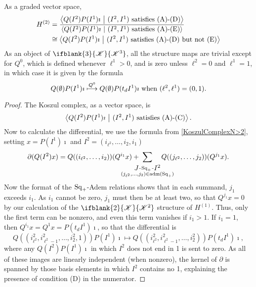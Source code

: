 \documentclass[10pt]{article}
\makeatletter
\newcommand{\LL}[1]{\ifblank{#1}{\scrK}{\scrK^{#1}}}
\newcommand{\produces}[3]{{#1}{#3}{#2}}
\newcommand{\admis}[1]{\mathrm{adm}(#1)}%
\renewcommand{\Q}{Q}
\newcommand{\SqShift}{\Sq_{\smash{+}}}
\newcommand{\Sq}{\mathrm{Sq}}
\renewcommand{\produces}[3]{
{
\def\labelstyle{\scriptstyle}
\xymatrix@C=2em@1{
{#1}
\ar@{-}[r]|-{{\,#3\,}}
&%
{#2}%
}}}
\makeatother
\begin{document}
\begin{CalculatingRepeatedKoszul}
\begin{prop}
As a graded vector space,
\begin{alignat*}{2}
H^{(2)}
&=
\frac{\left\langle \Q(I^2)P(I^1)\imath\ \middle|\  (I^2,I^1)\textup{ satisfies \textup{(A)}-\textup{(D)}}\right\rangle}{\left\langle \Q(I^2)P(I^1)\imath\ \middle|\  (I^2,I^1)\textup{ satisfies \textup{(A)}-\textup{(E)}}\right\rangle}%
\\
&\cong
{\left\langle \Q(I^2)P(I^1)\imath\ \middle|\  (I^2,I^1)\textup{ satisfies \textup{(A)}-\textup{(D)} but not \textup{(E)}}\right\rangle}%
\end{alignat*}
As an object of $\LL{3}$, all the structure maps are trivial except for $\Q^0$, which is defined whenever $\ell^1>0$, and is zero unless $\ell^2=0$ and $\ell^1=1$, in which case it is given by the formula \[\Q(\emptyset)P(I^1)\imath \overset{\Q^0}{\mapsto} \Q(\emptyset)P(t_dI^1)\imath\textup{ when $(\ell^2,\ell^1)=(0,1)$}.\]
\end{prop}
\begin{proof}
The Koszul complex, as a vector space, is \[\left\langle \Q(I^2)P(I^1)\imath\ \middle|\ (I^2,I^1)\textup{ satisfies \textup{(A)}-\textup{(C)}}\right\rangle.\] %
Now to calculate the differential, we use the formula from \ref{KoszulComplexN>2}, setting $x=P(I^1)\imath$ and $I^2=(i_{\ell^2},\ldots,i_2,i_1)$
\[\partial(\Q(I^2)x)=\Q((i_{\ell^2},\ldots,i_2))(\Q^{i_1}x)+ \!\!\!\!\!\!\!\!\!\!\!\!\!\!\!\!\!\sum_{ \substack{\produces{J}{I^2}{\SqShift}\\(j_{\ell^2},\ldots,j_2)\in\admis{\SqShift}}}\!\!\!\!\!\!\!\!\!\!\!\! \Q((j_{\ell^2},\ldots,j_2))(\Q^{j_1}x).\]
Now the format of the $\SqShift$-Adem relations shows that in each summand, $j_1$ exceeds $i_1$. As $i_1$ cannot be zero, $j_1$ must then be at least two, so that $Q^{j_1}x=0$ by our calculation of the $\LL{2}$ structure of $H^{(1)}$. Thus, only the first term can be nonzero, and even this term vanishes if $i_1>1$. If $i_1=1$, then $\Q^{i_1}x=\Q^1x=P(t_dI^1)\imath$, so that the differential is
\[\Q((i^2_{\ell^2},i^2_{\ell^2-1},\ldots,i^2_{2},1))P(I^1)\imath\mapsto \Q((i^2_{\ell^2},i^2_{\ell^2-1},\ldots,i^2_{2}))P(t_dI^1)\imath,\]
where any $\Q(I^2)P(I^1)\imath$ in which $I^2$ does not end in 1 is sent to zero. As all of these images are linearly independent (when nonzero), the kernel of $\partial$ is spanned by those basis elements in which $I^2$ contains no 1, explaining the presence of condition \textup{(D)} in the numerator.


\end{proof}
\end{CalculatingRepeatedKoszul}
\end{document}
